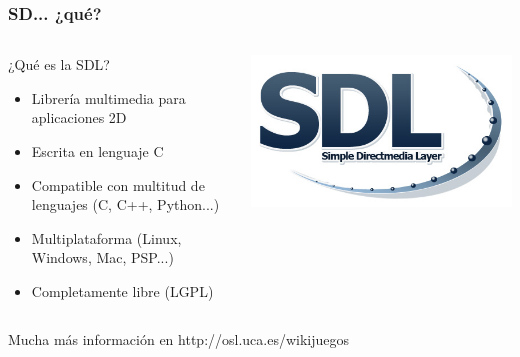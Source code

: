 \begin{frame}
    \frametitle{SD... ¿qué?}
    
    
    \begin{columns}[c]
		\column{220pt}
		\begin{block}{¿Qué es la SDL?}
            \begin{itemize}
                \item Librería multimedia para aplicaciones 2D
                \item Escrita en lenguaje C
                \item Compatible con multitud de lenguajes (C, C++, Python...)
                \item Multiplataforma (Linux, Windows, Mac, PSP...)
                \item Completamente libre (LGPL)
            \end{itemize}            
        \end{block}
        
		\column{100pt}
		\begin{center}
			\includegraphics[scale=0.2]{img/sdl.jpeg}
		\end{center}
	\end{columns}
    
    \begin{center}
        Mucha más información en http://osl.uca.es/wikijuegos
    \end{center}
\end{frame}

